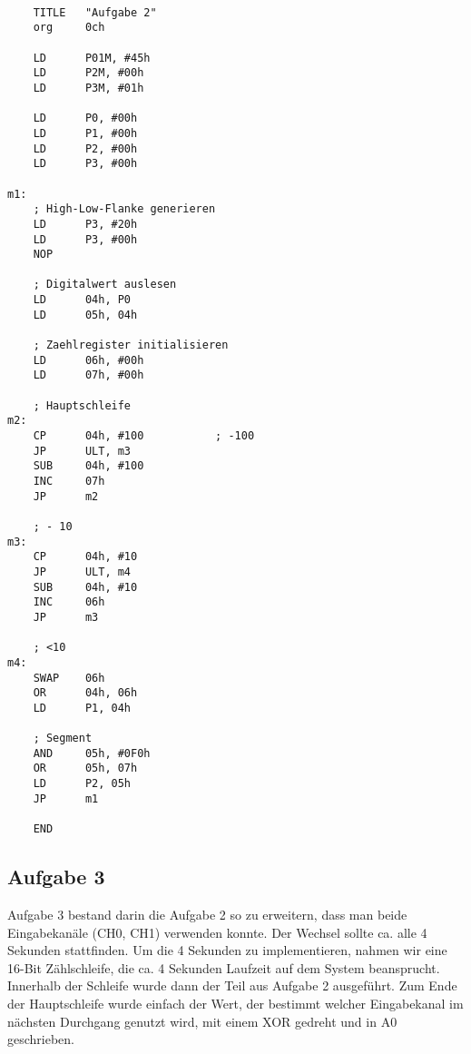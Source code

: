 \documentclass[a4paper,11pt]{article}
\begin{document}
\begin{lstlisting}

	TITLE   "Aufgabe 2"
	org     0ch

	LD      P01M, #45h
	LD      P2M, #00h
	LD      P3M, #01h

	LD      P0, #00h
	LD      P1, #00h
	LD      P2, #00h
	LD      P3, #00h

m1:
	; High-Low-Flanke generieren
	LD      P3, #20h
	LD      P3, #00h
	NOP

	; Digitalwert auslesen
	LD      04h, P0
	LD      05h, 04h

	; Zaehlregister initialisieren
	LD      06h, #00h
	LD      07h, #00h 

	; Hauptschleife
m2:
	CP      04h, #100			; -100
	JP      ULT, m3
	SUB     04h, #100
    INC     07h
	JP      m2

	; - 10
m3:
	CP      04h, #10
	JP      ULT, m4
	SUB     04h, #10
	INC     06h
	JP      m3

	; <10
m4:
	SWAP    06h
	OR      04h, 06h
	LD      P1, 04h	

	; Segment
	AND     05h, #0F0h
	OR      05h, 07h
	LD      P2, 05h
	JP      m1

	END

\end{lstlisting}

\subsection{Aufgabe 3}
Aufgabe 3 bestand darin die Aufgabe 2 so zu erweitern, dass man beide Eingabekanäle (CH0, CH1) verwenden konnte. Der Wechsel sollte ca. alle 4 Sekunden stattfinden. 
Um die 4 Sekunden zu implementieren, nahmen wir eine 16-Bit Zählschleife, die ca. 4 Sekunden Laufzeit auf dem System beansprucht. 
Innerhalb der Schleife wurde dann der Teil aus Aufgabe 2 ausgeführt. 
Zum Ende der Hauptschleife wurde einfach der Wert, der bestimmt welcher Eingabekanal im nächsten Durchgang genutzt wird, mit einem XOR gedreht und in A0 geschrieben.
\end{document}
